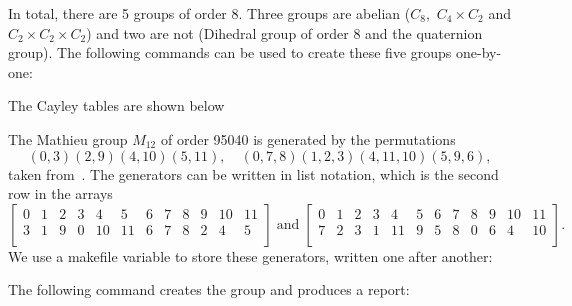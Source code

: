 In total, there are 5 groups of order 8. 
Three groups are abelian ($C_8,$ $C_4 \times C_2$ and $C_2 \times C_2 \times C_2$) 
and two are not (Dihedral group of order 8 and the quaternion group).
The following commands can be used to create these five groups one-by-one:










The Cayley tables are shown below



\bigskip

The Mathieu group $M_{12}$ of order 95040 is generated by the permutations 
$$
(0,3)(2,9)(4,10)(5,11), \quad (0,7,8)(1,2,3)(4,11,10)(5,9,6),
$$
taken from~\cite{Atlas3}.
The generators can be written in list notation, which is the second row in the arrays
$$
\left[
\begin{array}{cccccccccccc}
0&1&2&3&4&5&6&7&8&9&10&11\\
3&1&9&0&10&11&6&7&8&2&4&5\\
\end{array}
\right]
\;
\mbox{and}
\;
\left[
\begin{array}{cccccccccccc}
0&1&2&3&4&5&6&7&8&9&10&11\\
7&2&3&1&11&9&5&8&0&6&4&10\\
\end{array}
\right].
$$
We use a makefile variable to store these generators, 
written one after another:


The following command creates the group and produces a report:







\bigskip

